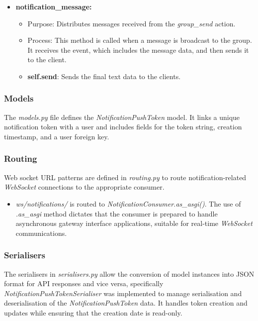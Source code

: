 \begin{itemize}
    \item \textbf{notification\_message:}
    \begin{itemize}
        \item Purpose: Distributes messages received from the \textit{group\_send} action.
        \item Process: This method is called when a message is broadcast to the group. It receives the event, which includes the message data, and then sends it to the client.
        \item \textbf{self.send}: Sends the final text data to the clients.
    \end{itemize}
\end{itemize}

\subsubsection{Models}

The \textit{models.py} file defines the \textit{NotificationPushToken} model. It links a unique notification token with a user and includes fields for the token string, creation timestamp, and a user foreign key.

\subsubsection{Routing}

Web socket URL patterns are defined in \textit{routing.py} to route notification-related \textit{WebSocket} connections to the appropriate consumer.

\begin{itemize}
    \item \textit{ws/notifications/} is routed to \textit{NotificationConsumer.as\_asgi()}. The use of \textit{.as\_asgi} method dictates that the consumer is prepared to handle asynchronous gateway interface applications, suitable for real-time \textit{WebSocket} communications.
\end{itemize}

\subsubsection{Serialisers}

The serialisers in \textit{serialisers.py} allow the conversion of model instances into JSON format for API responses and vice versa, specifically \textit{NotificationPushTokenSerialiser} was implemented to manage serialisation and deserialisation of the \textit{NotificationPushToken} data. It handles token creation and updates while ensuring that the creation date is read-only.

